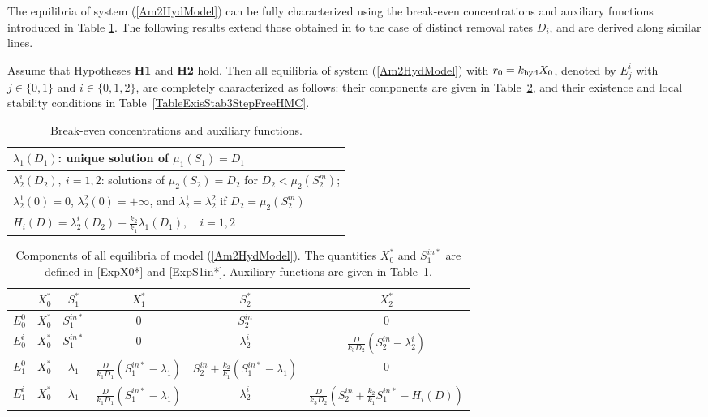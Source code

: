\documentclass[runningheads]{llncs}
\begin{document}
The equilibria of system (\ref{Am2HydModel}) can be fully characterized using the break-even concentrations and auxiliary functions introduced in Table \ref{tab:auxiliary}. 
The following results extend those obtained in \cite{BenyahiaJPC2012,SariNonLinDyn2021} to the case of distinct removal rates $D_i$, and are derived along similar lines.
\begin{proposition}
Assume that Hypotheses \textbf{H1} and \textbf{H2} hold. Then all equilibria of system (\ref{Am2HydModel}) with 
$r_0 = k_{\rm hyd} X_0$, 
denoted by $E_j^i$ with $j\in\{0,1\}$ and $i\in\{0,1,2\}$, are completely characterized as follows: their components are given in Table~\ref{TableComp3StepFreeHMC}, and their existence and local stability conditions in Table~\ref{TableExisStab3StepFreeHMC}.
\end{proposition}
\begin{table}[!ht]
\centering
\setlength{\abovecaptionskip}{3pt}
\setlength{\belowcaptionskip}{3pt}
\caption{Break-even concentrations and auxiliary functions.}\label{tab:auxiliary}
\begin{tabular}{l}
\toprule
$\lambda_1(D_1)$: unique solution of $\mu_1(S_1)=D_1$ \\
\midrule
$\lambda_2^i(D_2),\ i=1,2$: solutions of $\mu_2(S_2)=D_2$ for $D_2<\mu_2(S_2^m)$; \\
$\lambda_2^1(0)=0$, $\lambda_2^2(0)=+\infty$, and $\lambda_2^1=\lambda_2^2$ if $D_2=\mu_2(S_2^m)$ \\
\midrule
$H_i(D)=\lambda_2^i(D_2)+\tfrac{k_2}{k_1}\lambda_1(D_1),\quad i=1,2$ \\
\bottomrule
\end{tabular}
\end{table}
\begin{table}[!ht]
\setlength{\abovecaptionskip}{3pt}
\setlength{\belowcaptionskip}{3pt}
\caption{Components of all equilibria of model (\ref{Am2HydModel}). The quantities $X_0^*$ and $S_1^{in*}$ are defined in \eqref{ExpX0*} and \eqref{ExpS1in*}. Auxiliary functions are given in Table~\ref{tab:auxiliary}.}
\label{TableComp3StepFreeHMC}
\begin{center}
\renewcommand{\arraystretch}{1.2}
\begin{tabular}{l c c c c c}
\toprule
 & $X_0^*$ & $S_1^*$ & $X_1^*$ & $S_2^*$ & $X_2^*$ \\
\midrule
$E_0^0$ 
& $X_0^*$ 
& $S_1^{in*}$ 
& $0$ 
& $S_2^{in}$ 
& $0$ \\
$E_0^i$ 
& $X_0^*$ 
& $S_1^{in*}$ 
& $0$ 
& $\lambda_2^i$ 
& $\tfrac{D}{k_3 D_2}(S_2^{in}-\lambda_2^i)$ \\
$E_1^0$ 
& $X_0^*$ 
& $\lambda_1$ 
& $\tfrac{D}{k_1 D_1}(S_1^{in*}-\lambda_1)$ 
& $S_2^{in}+\tfrac{k_2}{k_1}(S_1^{in*}-\lambda_1)$ 
& $0$ \\
$E_1^i$ 
& $X_0^*$ 
& $\lambda_1$ 
& $\tfrac{D}{k_1 D_1}(S_1^{in*}-\lambda_1)$ 
& $\lambda_2^i$ 
& $\tfrac{D}{k_3 D_2}\left(S_2^{in}+\tfrac{k_2}{k_1}S_1^{in*}-H_i(D)\right)$ \\
\bottomrule
\end{tabular}
\end{center}
\end{table}
\end{document}
